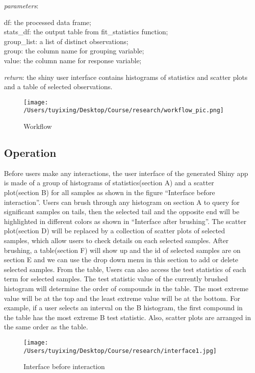 \documentclass[
]{article}
\begin{document}
\emph{parameters}:

df: the processed data frame;\\
stats\_df: the output table from fit\_statistics function;\\
group\_list: a list of distinct observations;\\
group: the column name for grouping variable;\\
value: the column name for response variable;

\emph{return}: the shiny user interface contains histograms of
statistics and scatter plots and a table of selected observations.

\begin{figure}
\centering
\texttt{[image: /Users/tuyixing/Desktop/Course/research/workflow\_pic.png]}
\caption{Workflow}
\end{figure}

\hypertarget{operation}{%
\subsection{Operation}\label{operation}}

Before users make any interactions, the user interface of the generated
Shiny app is made of a group of histograms of statistics(section A) and
a scatter plot(section B) for all samples as shown in the figure
``Interface before interaction''. Users can brush through any histogram
on section A to query for significant samples on tails, then the
selected tail and the opposite end will be highlighted in different
colors as shown in ``Interface after brushing''. The scatter
plot(section D) will be replaced by a collection of scatter plots of
selected samples, which allow users to check details on each selected
samples. After brushing, a table(section F) will show up and the id of
selected samples are on section E and we can use the drop down menu in
this section to add or delete selected samples. From the table, Users
can also access the test statistics of each term for selected samples.
The test statistic value of the currently brushed histogram will
determine the order of compounds in the table. The most extreme value
will be at the top and the least extreme value will be at the bottom.
For example, if a user selects an interval on the B histogram, the first
compound in the table has the most extreme B test statistic. Also,
scatter plots are arranged in the same order as the table.

\begin{figure}
\centering
\texttt{[image: /Users/tuyixing/Desktop/Course/research/interface1.jpg]}
\caption{Interface before interaction}
\end{figure}
\end{document}
